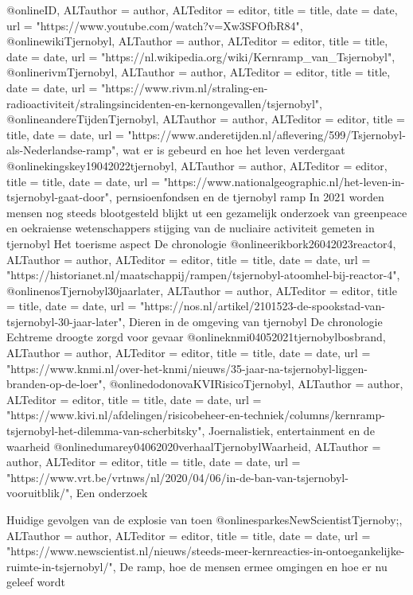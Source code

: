 @online{ID,	ALTauthor = {author},	ALTeditor = {editor},	title = {title},	date = {date},	url = {"https://www.youtube.com/watch?v=Xw3SFOfbR84"},}
\cite{}
@online{wikiTjernobyl,	ALTauthor = {author},	ALTeditor = {editor},	title = {title},	date = {date},	url = {"https://nl.wikipedia.org/wiki/Kernramp_van_Tsjernobyl"},}
\cite{}
@online{rivmTjernobyl,	ALTauthor = {author},	ALTeditor = {editor},	title = {title},	date = {date},	url = {"https://www.rivm.nl/straling-en-radioactiviteit/stralingsincidenten-en-kernongevallen/tsjernobyl"},}
\cite{}
@online{andereTijdenTjernobyl,	ALTauthor = {author},	ALTeditor = {editor},	title = {title},	date = {date},	url = {"https://www.anderetijden.nl/aflevering/599/Tsjernobyl-als-Nederlandse-ramp"},}
\cite{}
wat er is gebeurd en hoe het leven verdergaat
@online{kingskey19042022tjernobyl,	ALTauthor = {author},	ALTeditor = {editor},	title = {title},	date = {date},	url = {"https://www.nationalgeographic.nl/het-leven-in-tsjernobyl-gaat-door"},}
\cite{}
pernsioenfondsen en de tjernobyl ramp
In 2021 worden mensen nog steeds blootgesteld blijkt ut een gezamelijk onderzoek van greenpeace en oekraiense wetenschappers
stijging van de nucliaire activiteit gemeten in tjernobyl
Het toerisme  aspect
De chronologie
@online{erikbork26042023reactor4,	ALTauthor = {author},	ALTeditor = {editor},	title = {title},	date = {date},	url = {"https://historianet.nl/maatschappij/rampen/tsjernobyl-atoomhel-bij-reactor-4"},}
\cite{}
@online{nosTjernobyl30jaarlater,	ALTauthor = {author},	ALTeditor = {editor},	title = {title},	date = {date},	url = {"https://nos.nl/artikel/2101523-de-spookstad-van-tsjernobyl-30-jaar-later"},}
\cite{}
Dieren in de omgeving van tjernobyl
De chronologie
Echtreme droogte zorgd voor gevaar
@online{knmi04052021tjernobylbosbrand,	ALTauthor = {author},	ALTeditor = {editor},	title = {title},	date = {date},	url = {"https://www.knmi.nl/over-het-knmi/nieuws/35-jaar-na-tsjernobyl-liggen-branden-op-de-loer"},}
\cite{}
@online{dodonovaKVIRisicoTjernobyl,	ALTauthor = {author},	ALTeditor = {editor},	title = {title},	date = {date},	url = {"https://www.kivi.nl/afdelingen/risicobeheer-en-techniek/columns/kernramp-tsjernobyl-het-dilemma-van-scherbitsky"},}
\cite{}
Joernalistiek, entertainment en de waarheid
@online{dumarey04062020verhaalTjernobylWaarheid,	ALTauthor = {author},	ALTeditor = {editor},	title = {title},	date = {date},	url = {"https://www.vrt.be/vrtnws/nl/2020/04/06/in-de-ban-van-tsjernobyl-vooruitblik/"},}
\cite{}
Een onderzoek

Huidige gevolgen van de explosie van toen
@online{sparkesNewScientistTjernoby;,	ALTauthor = {author},	ALTeditor = {editor},	title = {title},	date = {date},	url = {"https://www.newscientist.nl/nieuws/steeds-meer-kernreacties-in-ontoegankelijke-ruimte-in-tsjernobyl/"},}
\cite{}
De ramp, hoe de mensen ermee omgingen en hoe er nu geleef wordt

